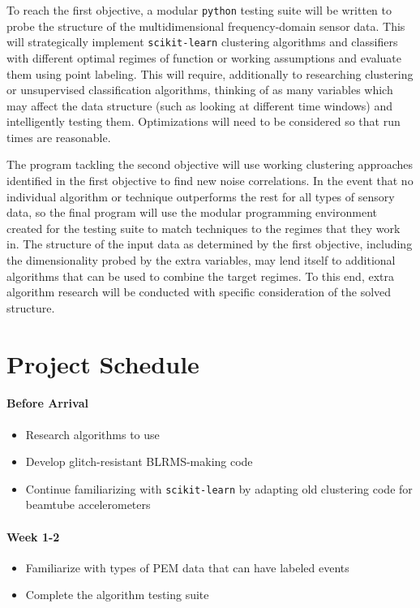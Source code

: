 \documentclass[colorlinks=true,pdfstartview=FitV,linkcolor=blue,
            citecolor=red,urlcolor=magenta]{ligodoc}
\begin{document}
To reach the first objective, a modular \texttt{python} testing suite will be written to probe the structure of the multidimensional frequency-domain sensor data.
This will strategically implement \texttt{scikit-learn} clustering algorithms and classifiers with different optimal regimes of function or working assumptions and evaluate them using point labeling. 
This will require, additionally to researching clustering or unsupervised classification algorithms, thinking of as many variables which may affect the data structure (such as looking at different time windows) and intelligently testing them. 
Optimizations will need to be considered so that run times are reasonable.

The program tackling the second objective will use working clustering approaches identified in the first objective to find new noise correlations.
In the event that no individual algorithm or technique outperforms the rest for all types of sensory data, so the final program will use the modular programming environment created for the testing suite to match techniques to the regimes that they work in.
The structure of the input data as determined by the first objective, including the dimensionality probed by the extra variables, may lend itself to additional algorithms that can be used to combine the target regimes.
To this end, extra algorithm research will be conducted with specific consideration of the solved structure.


\section{Project Schedule}
\paragraph{Before Arrival}
\begin{itemize}
\item Research algorithms to use
\item Develop glitch-resistant BLRMS-making code
\item Continue familiarizing with \texttt{scikit-learn} by adapting old clustering code for beamtube accelerometers
\end{itemize}
\paragraph{Week 1-2}
\begin{itemize}
\item Familiarize with types of PEM data that can have labeled events
\item Complete the algorithm testing suite
\end{itemize}
\end{document}
